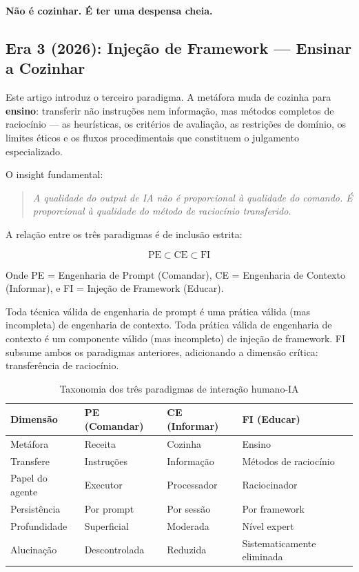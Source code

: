 \documentclass[12pt,a4paper]{article}
\begin{document}
\textbf{Não é cozinhar. É ter uma despensa cheia.}

\subsection{Era 3 (2026): Injeção de Framework --- Ensinar a Cozinhar}

Este artigo introduz o terceiro paradigma. A metáfora muda de cozinha para \textbf{ensino}: transferir não instruções nem informação, mas métodos completos de raciocínio --- as heurísticas, os critérios de avaliação, as restrições de domínio, os limites éticos e os fluxos procedimentais que constituem o julgamento especializado.

O insight fundamental:

\begin{quote}
\emph{A qualidade do output de IA não é proporcional à qualidade do comando. É proporcional à qualidade do método de raciocínio transferido.}
\end{quote}

A relação entre os três paradigmas é de inclusão estrita:

$$\text{PE} \subset \text{CE} \subset \text{FI}$$

Onde PE = Engenharia de Prompt (Comandar), CE = Engenharia de Contexto (Informar), e FI = Injeção de Framework (Educar).

Toda técnica válida de engenharia de prompt é uma prática válida (mas incompleta) de engenharia de contexto. Toda prática válida de engenharia de contexto é um componente válido (mas incompleto) de injeção de framework. FI subsume ambos os paradigmas anteriores, adicionando a dimensão crítica: transferência de raciocínio.

\begin{table}[htbp]
\centering
\small
\caption{Taxonomia dos três paradigmas de interação humano-IA}
\label{tab:taxonomia}
\begin{tabular}{l l l l}
\toprule
\textbf{Dimensão} & \textbf{PE (Comandar)} & \textbf{CE (Informar)} & \textbf{FI (Educar)} \\
\midrule
Metáfora & Receita & Cozinha & Ensino \\
Transfere & Instruções & Informação & Métodos de raciocínio \\
Papel do agente & Executor & Processador & Raciocinador \\
Persistência & Por prompt & Por sessão & Por framework \\
Profundidade & Superficial & Moderada & Nível expert \\
Alucinação & Descontrolada & Reduzida & Sistematicamente eliminada \\
\bottomrule
\end{tabular}
\end{table}
\end{document}
